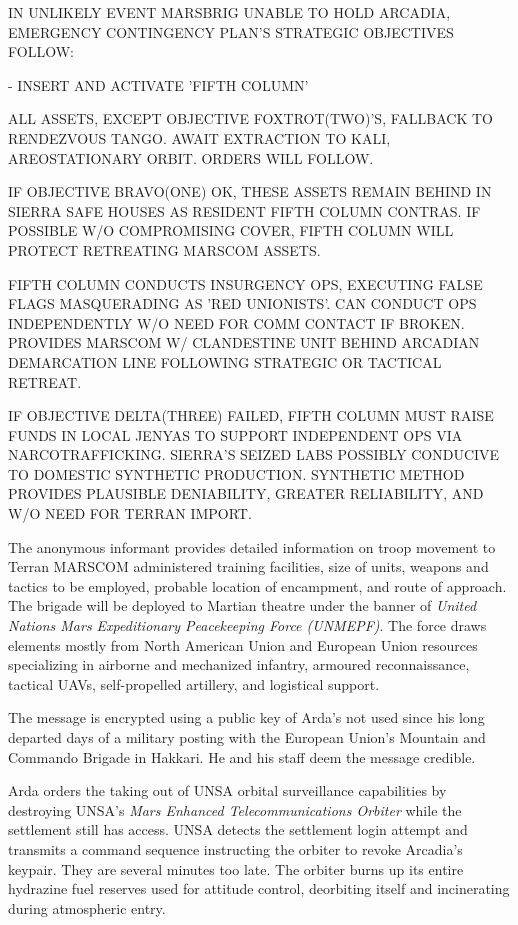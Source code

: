 IN UNLIKELY EVENT MARSBRIG UNABLE TO HOLD ARCADIA, EMERGENCY CONTINGENCY PLAN'S STRATEGIC OBJECTIVES FOLLOW:
\startitemize[4]
\item {} - INSERT AND ACTIVATE 'FIFTH COLUMN'

    \startitemize[n]
    \item ALL ASSETS, EXCEPT OBJECTIVE FOXTROT(TWO)'S, FALLBACK TO RENDEZVOUS TANGO. AWAIT EXTRACTION TO KALI, AREOSTATIONARY ORBIT. ORDERS WILL FOLLOW.

    \item IF OBJECTIVE BRAVO(ONE) OK, THESE ASSETS REMAIN BEHIND IN SIERRA SAFE HOUSES AS RESIDENT FIFTH COLUMN CONTRAS. IF POSSIBLE W/O COMPROMISING COVER, FIFTH COLUMN WILL PROTECT RETREATING MARSCOM ASSETS.

    \item FIFTH COLUMN CONDUCTS INSURGENCY OPS, EXECUTING FALSE FLAGS MASQUERADING AS 'RED UNIONISTS'. CAN CONDUCT OPS INDEPENDENTLY W/O NEED FOR COMM CONTACT IF BROKEN. PROVIDES MARSCOM W/ CLANDESTINE UNIT BEHIND ARCADIAN DEMARCATION LINE FOLLOWING STRATEGIC OR TACTICAL RETREAT.

    \item IF OBJECTIVE DELTA(THREE) FAILED, FIFTH COLUMN MUST RAISE FUNDS IN LOCAL JENYAS TO SUPPORT INDEPENDENT OPS VIA NARCOTRAFFICKING. SIERRA'S SEIZED LABS POSSIBLY CONDUCIVE TO DOMESTIC SYNTHETIC PRODUCTION. SYNTHETIC METHOD PROVIDES PLAUSIBLE DENIABILITY, GREATER RELIABILITY, AND W/O NEED FOR TERRAN IMPORT.
    \stopitemize
\stopitemize
\stopTimelineCorrespondenceDocument

The anonymous informant provides detailed information on troop movement to Terran MARSCOM administered training facilities, size of units, weapons and tactics to be employed, probable location of encampment, and route of approach. The brigade will be deployed to Martian theatre under the banner of {\it United Nations Mars Expeditionary Peacekeeping Force (UNMEPF)}. The force draws elements mostly from North American Union and European Union resources specializing in airborne and mechanized infantry, armoured reconnaissance, tactical UAVs, self-propelled artillery, and logistical support.

The message is encrypted using a public key of Arda's not used since his long departed days of a military posting with the European Union's Mountain and Commando Brigade in Hakkari. He and his staff deem the message credible.
\StopTimelineDate

Arda orders the taking out of UNSA orbital surveillance capabilities by destroying UNSA's {\it Mars Enhanced Telecommunications Orbiter} while the settlement still has access. UNSA detects the settlement login attempt and transmits a command sequence instructing the orbiter to revoke Arcadia's keypair. They are several minutes too late. The orbiter burns up its entire hydrazine fuel reserves used for attitude control, deorbiting itself and incinerating during atmospheric entry.

